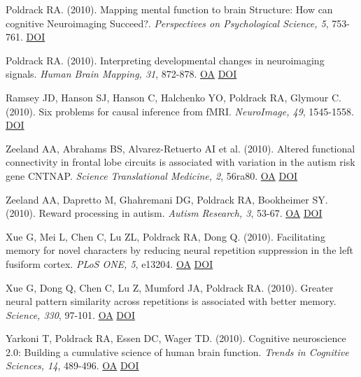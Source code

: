 \documentclass[10pt, letterpaper]{article}
\begin{document}
Poldrack RA.  (2010). Mapping mental function to brain Structure: How can cognitive Neuroimaging Succeed?. \textit{Perspectives on Psychological Science, 5}, 753-761. \href{https://doi.org/10.1177/1745691610388777}{DOI} \vspace{2mm}

Poldrack RA.  (2010). Interpreting developmental changes in neuroimaging signals. \textit{Human Brain Mapping, 31}, 872-878. \href{https://www.ncbi.nlm.nih.gov/pmc/articles/PMC6870770}{OA} \href{https://doi.org/10.1002/hbm.21039}{DOI} \vspace{2mm}

Ramsey JD, Hanson SJ, Hanson C, Halchenko YO, Poldrack RA, Glymour C.  (2010). Six problems for causal inference from fMRI. \textit{NeuroImage, 49}, 1545-1558. \href{https://doi.org/10.1016/j.neuroimage.2009.08.065}{DOI} \vspace{2mm}

Zeeland AA, Abrahams BS, Alvarez-Retuerto AI et al. (2010). Altered functional connectivity in frontal lobe circuits is associated with variation in the autism risk gene CNTNAP. \textit{Science Translational Medicine, 2}, 56ra80. \href{https://www.ncbi.nlm.nih.gov/pmc/articles/PMC3065863}{OA} \href{https://doi.org/10.1126/scitranslmed.3001344}{DOI} \vspace{2mm}

Zeeland AA, Dapretto M, Ghahremani DG, Poldrack RA, Bookheimer SY.  (2010). Reward processing in autism. \textit{Autism Research, 3}, 53-67. \href{https://www.ncbi.nlm.nih.gov/pmc/articles/PMC3076289}{OA} \href{https://doi.org/10.1002/aur.122}{DOI} \vspace{2mm}

Xue G, Mei L, Chen C, Lu ZL, Poldrack RA, Dong Q.  (2010). Facilitating memory for novel characters by reducing neural repetition suppression in the left fusiform cortex. \textit{PLoS ONE, 5}, e13204. \href{https://www.ncbi.nlm.nih.gov/pmc/articles/PMC2950859}{OA} \href{https://doi.org/10.1371/journal.pone.0013204}{DOI} \vspace{2mm}

Xue G, Dong Q, Chen C, Lu Z, Mumford JA, Poldrack RA.  (2010). Greater neural pattern similarity across repetitions is associated with better memory. \textit{Science, 330}, 97-101. \href{https://www.ncbi.nlm.nih.gov/pmc/articles/PMC2952039}{OA} \href{https://doi.org/10.1126/science.1193125}{DOI} \vspace{2mm}

Yarkoni T, Poldrack RA, Essen DC, Wager TD.  (2010). Cognitive neuroscience 2.0: Building a cumulative science of human brain function. \textit{Trends in Cognitive Sciences, 14}, 489-496. \href{https://www.ncbi.nlm.nih.gov/pmc/articles/PMC2963679}{OA} \href{https://doi.org/10.1016/j.tics.2010.08.004}{DOI} \vspace{2mm}
\end{document}
